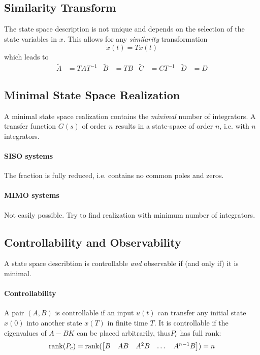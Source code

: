 \subsection{Similarity Transform}
The state space description is not unique and depends on the selection
of the state variables in $x$.
This allows for any \emph{similarity} transformation
\[
    \tilde{x}(t) = T x(t)
\]
which leads to
\begin{align*}
    \tilde{A} &= T A T^{-1} &
    \tilde{B} &= T B & 
    \tilde{C} &= C T^{-1} &
    \tilde{D} &= D
\end{align*}

\subsection{Minimal State Space Realization}
A minimal state space realization contains the \emph{minimal} number of integrators.
A transfer function $G(s)$ of order $n$ results in a state-space of order $n$, i.e.
with $n$ integrators.

\paragraph{SISO systems}The fraction is fully reduced, i.e. contains no common poles and zeros.

\paragraph{MIMO systems}Not easily possible. Try to find realization with minimum number of integrators.

\subsection{Controllability and Observability}
A state space describtion is controllable \emph{and} observable if (and only if) it is minimal.

\paragraph{Controllability}A pair $(A,B)$ is controllable if an input $u(t)$ can transfer any
initial state $x(0)$ into another state $x(T)$ in finite time $T$.
It is controllable if the eigenvalues of $A-BK$ can be placed arbitrarily, thus$P_c$ has full rank:
\[
    \operatorname{rank}(P_c) = \operatorname{rank}(
        \begin{bmatrix}
            B & AB & A^2B & \dots & A^{n-1}B
        \end{bmatrix}
    ) = n
\]

